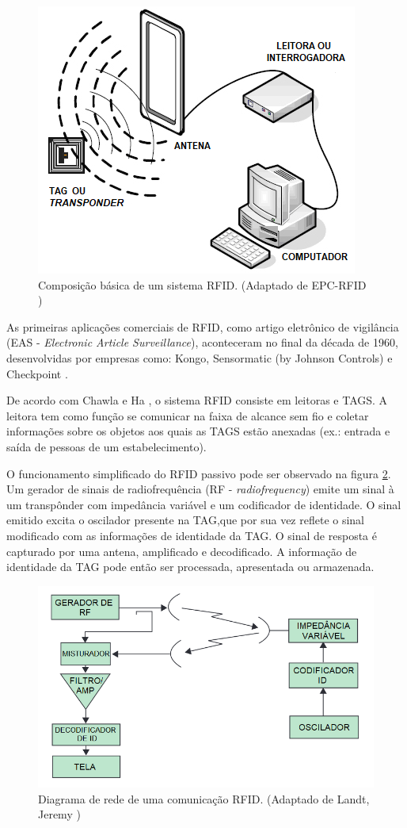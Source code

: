 \begin{figure}[H]
    \centering
    \includegraphics[width=0.6\linewidth]{figs/Fundamentos/Composicao.png}
    \caption{Composição básica de um sistema RFID. (Adaptado de EPC-RFID \cite{EPC-RFID-link})}
    \label{fig:ComposicaoRFID}
\end{figure}


As primeiras aplicações comerciais de RFID, como artigo eletrônico de vigilância (EAS - \textit{Electronic Article Surveillance}), aconteceram no final da década de 1960, desenvolvidas por empresas como: Kongo, Sensormatic (by Johnson Controls) e Checkpoint \cite{chawla2007overview}.

De acordo com Chawla e Ha \cite{chawla2007overview}, o sistema RFID consiste em leitoras e TAGS. A leitora tem como função se comunicar na faixa de alcance sem fio e coletar informações sobre os objetos aos quais as TAGS estão anexadas (ex.: entrada e saída de pessoas de um estabelecimento).

O funcionamento simplificado do RFID passivo pode ser observado na figura \ref{fig:DiagramaRFID}. Um gerador de sinais de radiofrequência (RF - \textit{radiofrequency}) emite um sinal à um transpônder com impedância variável e um codificador de identidade. O sinal emitido excita o oscilador presente na TAG,que por sua vez reflete o sinal modificado com as informações de identidade da TAG. O sinal de resposta é capturado por uma antena, amplificado e decodificado. A informação de identidade da TAG pode então ser processada, apresentada ou armazenada.

\begin{figure}[H]
    \centering
    \includegraphics[width=0.6\linewidth]{figs/Fundamentos/RFIDdiagram.png}
    \caption{Diagrama de rede de uma comunicação RFID. (Adaptado de Landt, Jeremy \cite{landt2005history})}
    \label{fig:DiagramaRFID}
\end{figure}

